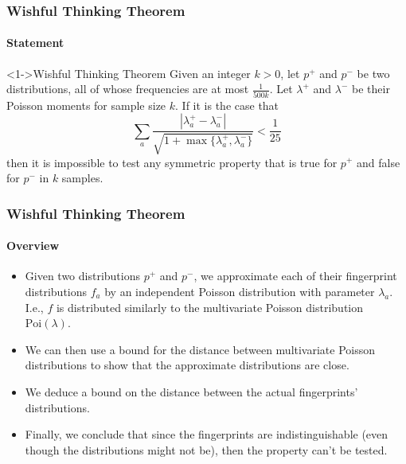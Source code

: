 \documentclass{beamer}
\begin{document}
\begin{frame}
  \frametitle{Wishful Thinking Theorem} \framesubtitle{Statement}

  \begin{block}<1->{Wishful Thinking Theorem}
    Given an integer $k>0$, let $p^+$ and $p^-$ be two distributions,
    all of whose frequencies are at most $\frac{1}{500k}$. Let
    $\lambda^+$ and $\lambda^-$ be their Poisson moments for sample
    size $k$. If it is the case that
    \begin{equation*}
      \sum_a\frac{|\lambda^+_a-\lambda^-_a|}{\sqrt{1+\max\{\lambda^+_a,\lambda^-_a\}}}<\frac{1}{25}
    \end{equation*}
    then it is impossible to test any symmetric property that is true
    for $p^+$ and false for $p^-$ in $k$ samples.
  \end{block}
\end{frame}

\begin{frame}
  \frametitle{Wishful Thinking Theorem} \framesubtitle{Overview}

  \begin{itemize}
  \item<1-> Given two distributions $p^+$ and $p^-$, we approximate
    each of their fingerprint distributions $f_a$ by an independent
    Poisson distribution with parameter $\lambda_a$. I.e., $f$ is
    distributed similarly to the multivariate Poisson distribution
    $\mbox{Poi}(\lambda)$.
  \item<2-> We can then use a bound for the distance between multivariate
    Poisson distributions to show that the approximate distributions
    are close.
  \item<3-> We deduce a bound on the distance between the
    actual fingerprints' distributions.
  \item<4-> Finally, we conclude that since the fingerprints are
    indistinguishable (even though the distributions might not be),
    then the property can't be tested.
  \end{itemize}

\end{frame}
\end{document}
